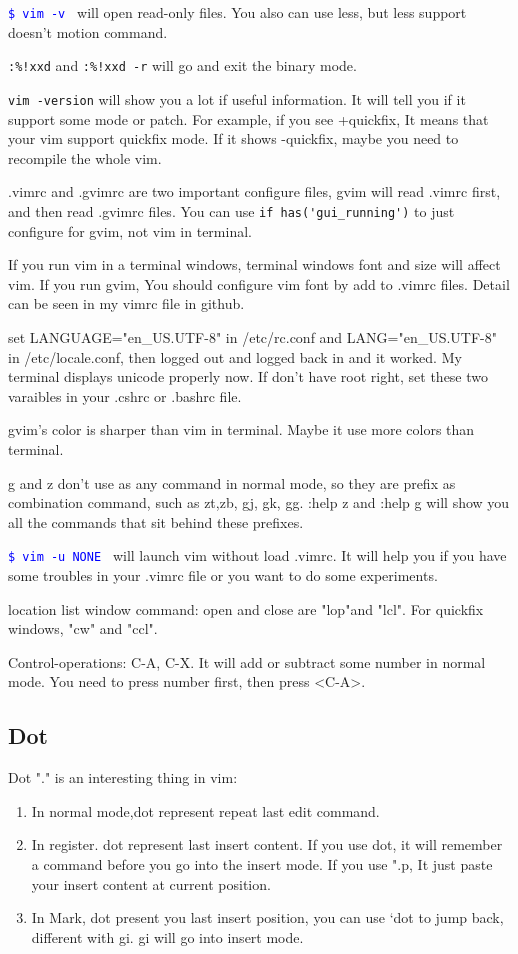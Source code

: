 \documentclass[paper=8.5in:11in, twoside, 12pt, pagesize=pdftex]{book}
\newcommand{\linuxcommand}[1]{\texttt{\textcolor{blue}{\$ #1 \Pisymbol{psy}{191}}}}
\begin{document}
\linuxcommand{vim -v} will open read-only files. You also can use less, but less support doesn't motion command.

\verb=:%!xxd= and \verb=:%!xxd -r= will go and exit the binary mode.

\verb=vim -version= will show you a lot if useful information. It will tell you if it support some mode or patch. For example, if you see +quickfix, It means that your vim support quickfix mode. If it shows -quickfix, maybe you need to recompile the whole vim.

.vimrc and .gvimrc are two important configure files, gvim  will read .vimrc first, and then read .gvimrc files.  You can use \verb=if has('gui_running')= to just configure for gvim, not vim in terminal. 

If you run vim in a terminal windows, terminal windows font and size will affect vim.  If you run gvim, You should configure vim font by add to .vimrc files. Detail can be seen in my vimrc file in github.

set LANGUAGE="en\_US.UTF-8" in /etc/rc.conf and LANG="en\_US.UTF-8" in /etc/locale.conf, then logged out and logged back in and it worked. My terminal displays unicode properly now. If don't have root right, set these two varaibles in your .cshrc or .bashrc file.

gvim's color is sharper than vim in terminal.  Maybe it use more colors than terminal.  

g and z don't use as any command in normal mode, so they are prefix as combination command, such as zt,zb, gj, gk, gg. :help z and :help g will show you all the commands that sit behind these prefixes.

\linuxcommand{vim -u NONE} will launch vim without load .vimrc. It will help you if you have some troubles in your .vimrc file or you want to do some experiments. 

location list window command: open and close are "lop"and "lcl". For quickfix windows, "cw" and "ccl".

Control-operations: C-A, C-X. It will add or subtract some number in normal mode. You need to press number first, then press <C-A>.

\subsection{Dot}


Dot "." is an interesting thing in vim:

\begin{enumerate}
	\item In normal mode,dot represent repeat last edit command.
	
	\item In register. dot represent last insert content. If you use dot, it will remember a command before you go into the insert mode. If you use ".p, It just paste your insert content at current position. 
	
	\item In Mark, dot present you last insert position, you can use `dot to jump back, different with gi. gi will go into insert mode.
\end{enumerate}
\end{document}
